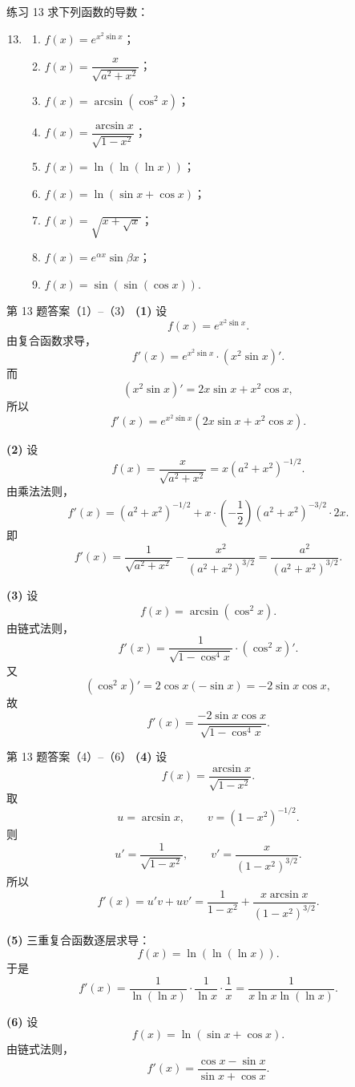 ﻿\documentclass[aspectratio=169,11pt]{ctexbeamer}
\begin{document}
\begin{frame}{练习 13}
\scriptsize
求下列函数的导数：
\begin{enumerate}
\setcounter{enumi}{12}
\item
\begin{enumerate}
\item $f(x)=e^{x^2\sin x}$；
\item $f(x)=\dfrac{x}{\sqrt{a^2+x^2}}$；
\item $f(x)=\arcsin(\cos^2x)$；
\item $f(x)=\dfrac{\arcsin x}{\sqrt{1-x^2}}$；
\item $f(x)=\ln(\ln(\ln x))$；
\item $f(x)=\ln(\sin x+\cos x)$；
\item $f(x)=\sqrt{x+\sqrt x}$；
\item $f(x)=e^{\alpha x}\sin\beta x$；
\item $f(x)=\sin(\sin(\cos x))$.
\end{enumerate}
\end{enumerate}
\end{frame}

\begin{frame}[allowframebreaks]{第 13 题答案（1）--（3）}
\scriptsize
\textbf{(1)} 设
\[
f(x)=e^{x^2\sin x}.
\]
由复合函数求导，
\[
f'(x)=e^{x^2\sin x}\cdot (x^2\sin x)'.
\]
而
\[
(x^2\sin x)'=2x\sin x+x^2\cos x,
\]
所以
\[
f'(x)=e^{x^2\sin x}(2x\sin x+x^2\cos x).
\]

\textbf{(2)} 设
\[
f(x)=\frac{x}{\sqrt{a^2+x^2}}=x(a^2+x^2)^{-1/2}.
\]
由乘法法则，
\[
f'(x)=(a^2+x^2)^{-1/2}+x\cdot\left(-\frac12\right)(a^2+x^2)^{-3/2}\cdot 2x.
\]
即
\[
f'(x)=\frac{1}{\sqrt{a^2+x^2}}-\frac{x^2}{(a^2+x^2)^{3/2}}
=\frac{a^2}{(a^2+x^2)^{3/2}}.
\]

\textbf{(3)} 设
\[
f(x)=\arcsin(\cos^2x).
\]
由链式法则，
\[
f'(x)=\frac{1}{\sqrt{1-\cos^4x}}\cdot (\cos^2x)'.
\]
又
\[
(\cos^2x)'=2\cos x(-\sin x)=-2\sin x\cos x,
\]
故
\[
f'(x)=\frac{-2\sin x\cos x}{\sqrt{1-\cos^4x}}.
\]
\end{frame}

\begin{frame}[allowframebreaks]{第 13 题答案（4）--（6）}
\scriptsize
\textbf{(4)} 设
\[
f(x)=\frac{\arcsin x}{\sqrt{1-x^2}}.
\]
取
\[
u=\arcsin x,\qquad v=(1-x^2)^{-1/2}.
\]
则
\[
u'=\frac1{\sqrt{1-x^2}},\qquad
v'=\frac{x}{(1-x^2)^{3/2}}.
\]
所以
\[
f'(x)=u'v+uv'
=\frac{1}{1-x^2}+\frac{x\arcsin x}{(1-x^2)^{3/2}}.
\]

\textbf{(5)} 三重复合函数逐层求导：
\[
f(x)=\ln(\ln(\ln x)).
\]
于是
\[
f'(x)=\frac1{\ln(\ln x)}\cdot\frac1{\ln x}\cdot\frac1x
=\frac{1}{x\ln x\ln(\ln x)}.
\]

\textbf{(6)} 设
\[
f(x)=\ln(\sin x+\cos x).
\]
由链式法则，
\[
f'(x)=\frac{\cos x-\sin x}{\sin x+\cos x}.
\]
\end{frame}
\end{document}
